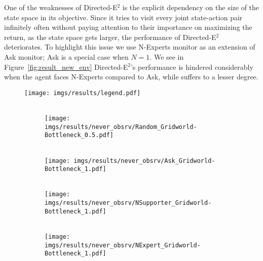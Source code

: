 One of the weaknesses of Directed-E$^2$ is the explicit dependency on the size of the state space in its objective. Since it tries to visit every joint state-action pair infinitely often without paying attention to their importance on maximizing the return, as the state space gets larger, the performance of Directed-E$^2$ deteriorates. To highlight this issue we use N-Experts monitor as an extension of Ask monitor; Ask is a special case when $N = 1$. We see in Figure~\ref{fig:result_new_env} Directed-E$^2$'s performance is hindered considerably when the agent faces N-Experts compared to Ask, while \thealgo suffers to a lesser degree.
%
%
%
\begin{figure}[bth]
    \centering
    \texttt{[image: imgs/results/legend.pdf]}
    \\[3pt]
    \hfill
    \begin{subfigure}[b]{0.16\linewidth}
        \centering
        \\
        \texttt{[image: imgs/results/never\_obsrv/Random\_Gridworld-Bottleneck\_0.5.pdf]}
    \end{subfigure} 
    \hfill
        \begin{subfigure}[b]{0.16\linewidth}
        \centering
        \\
        \texttt{[image: imgs/results/never\_obsrv/Ask\_Gridworld-Bottleneck\_1.pdf]}
    \end{subfigure} 
    \hfill
        \begin{subfigure}[b]{0.16\textwidth}
        \centering
        \\
        \texttt{[image: imgs/results/never\_obsrv/NSupporter\_Gridworld-Bottleneck\_1.pdf]}
    \end{subfigure} 
    \hfill
    \begin{subfigure}[b]{0.16\textwidth}
        \centering
        \\
        \texttt{[image: imgs/results/never\_obsrv/NExpert\_Gridworld-Bottleneck\_1.pdf]}
    \end{subfigure} 
    \hfill

\end{figure}
